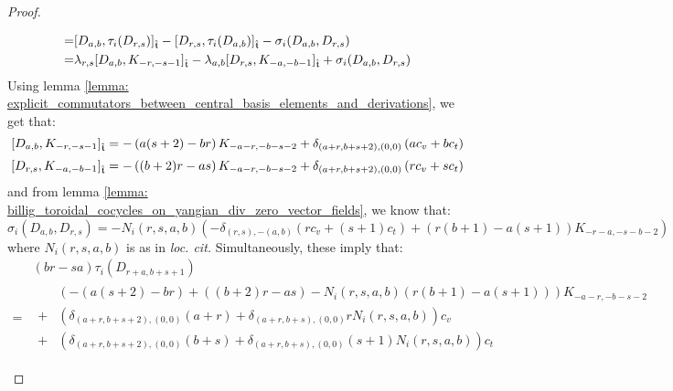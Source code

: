 \begin{proof}
\begin{enumerate}
$$\begin{aligned}
                                = & [D_{a, b}, \tau_i(D_{r, s})]_{\extendedtoroidal} - [D_{r, s}, \tau_i(D_{a, b})]_{\extendedtoroidal} - \sigma_i(D_{a, b}, D_{r, s})
                                \\
                                = & \lambda_{r, s} [D_{a, b}, K_{-r, -s - 1}]_{\extendedtoroidal} - \lambda_{a, b} [D_{r, s}, K_{-a, -b - 1}]_{\extendedtoroidal} + \sigma_i(D_{a, b}, D_{r, s})
                            \end{aligned}
                        $$
                    Using lemma \ref{lemma: explicit_commutators_between_central_basis_elements_and_derivations}, we get that:
                        $$[D_{a, b}, K_{-r, -s - 1}]_{\extendedtoroidal} = -\left( a(s + 2) - br \right) K_{-a - r, -b - s - 2} + \delta_{(a + r, b + s + 2), (0, 0)} \left( a c_v + b c_t \right)$$
                        $$[D_{r, s}, K_{-a, -b - 1}]_{\extendedtoroidal} = -\left( (b + 2) r - as \right) K_{-a - r, -b - s - 2} + \delta_{(a + r, b + s + 2), (0, 0)} \left( r c_v + s c_t \right)$$
                    and from lemma \ref{lemma: billig_toroidal_cocycles_on_yangian_div_zero_vector_fields}, we know that:
                        $$\sigma_i(D_{a, b}, D_{r, s}) = -N_i(r, s, a, b) \left( -\delta_{(r, s), -(a, b)} (r c_v + (s + 1) c_t) + ( r(b + 1) - a(s + 1) )K_{-r - a, -s - b - 2} \right)$$
                    where $N_i(r, s, a, b)$ is as in \textit{loc. cit.} Simultaneously, these imply that:
                        $$
                            \begin{aligned}
                                & (br - sa) \tau_i(D_{r + a, b + s + 1})
                                \\
                                = &
                                \begin{aligned}
                                    & \left( -\left( a(s + 2) - br \right) + \left( (b + 2) r - as \right) - N_i(r, s, a, b)( r(b + 1) - a(s + 1) ) \right) K_{-a - r, -b - s - 2}
                                    \\
                                    + & \left( \delta_{(a + r, b + s + 2), (0, 0)} (a + r) + \delta_{(a + r, b + s), (0, 0)} r N_i(r, s, a, b) \right) c_v
                                    \\
                                    + & \left( \delta_{(a + r, b + s + 2), (0, 0)} (b + s) + \delta_{(a + r, b + s), (0, 0)} (s + 1)N_i(r, s, a, b) \right) c_t
                                \end{aligned}

\end{aligned}$$
\end{enumerate}
\end{proof}
